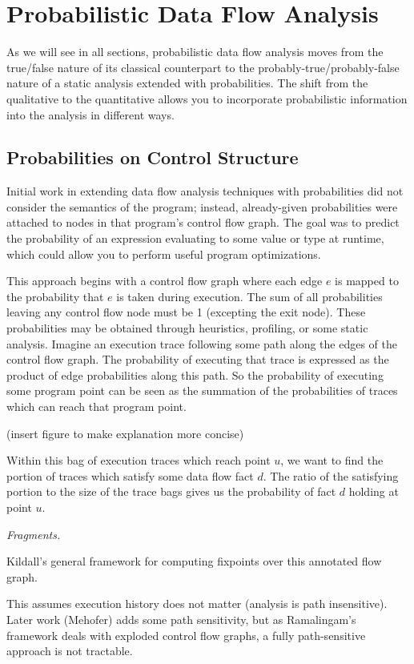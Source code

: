 \section{Probabilistic Data Flow Analysis}
\label{sec:pdfa}

As we will see in all sections, probabilistic data flow
analysis moves from the true/false nature of its classical
counterpart to the probably-true/probably-false nature of
a static analysis extended with probabilities.
The shift from the qualitative to the quantitative allows
you to incorporate probabilistic information into the
analysis in different ways.

\subsection{Probabilities on Control Structure}

Initial work in extending data flow analysis 
techniques with probabilities did not consider
the semantics of the program; instead, already-given probabilities 
were attached to nodes in that program's control flow graph.  
The goal was to predict the probability of an expression evaluating 
to some value or type at runtime, which could 
allow you to perform useful program optimizations.

This approach begins with a control flow graph where each edge $e$ is 
mapped to the probability that $e$ is taken during execution.
The sum of all probabilities leaving any control flow node must be 1
(excepting the exit node).
These probabilities may be obtained through heuristics, profiling,
or some static analysis.
Imagine an execution trace following some path along the edges of
the control flow graph.
The probability of executing that trace is expressed as the product of 
edge probabilities along this path.
So the probability of executing some program point can be seen as the
summation of the probabilities of traces which can reach that program
point.

(insert figure to make explanation more concise)

Within this bag of execution traces which reach point $u$, we want to 
find the portion of traces which satisfy some data flow fact $d$.  
The ratio of the satisfying portion to the size of the trace bags
gives us the probability of fact $d$ holding at point $u$.

{\sl 
Fragments. 

Kildall's general framework for computing fixpoints
over this annotated flow graph.

This assumes execution history does not matter (analysis is path 
insensitive).
Later work (Mehofer) adds some path sensitivity, but as Ramalingam's
framework deals with exploded control flow graphs, a fully 
path-sensitive approach is not tractable.
}

